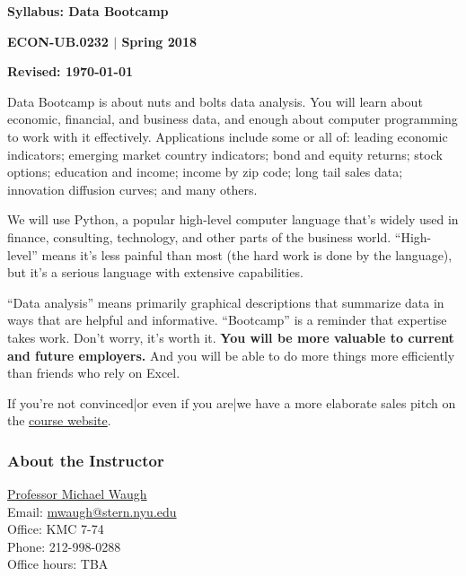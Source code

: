 



\pagestyle{headandfoot}
\runningheadrule
\firstpageheadrule
{}
\runningfooter{}{}{}


\centerline{\Large\bf Syllabus:  Data Bootcamp}
\vspace{3mm}
\centerline{\large\bf ECON-UB.0232 $|$ Spring 2018}
\vspace{3mm}
\centerline{\bf Revised:  \today}

\bigskip

Data Bootcamp is about nuts and bolts data analysis. You will learn about economic, financial, and business
data, and enough about computer programming to work with it effectively. Applications include some or all of: leading economic indicators; emerging market country indicators; bond and equity returns; stock options; education and income; income by zip code; long tail sales data; innovation diffusion curves; and many others.

We will use Python, a popular high-level computer language that's widely used in finance, consulting,
technology, and other parts of the business world. ``High-level'' means it's less painful than most (the hard work is done by the language), but it's a serious language with extensive capabilities.

``Data analysis'' means primarily graphical descriptions that summarize data
in ways that are helpful and informative. ``Bootcamp'' is a reminder that expertise takes work. Don't worry, it's worth it. {\bf You will be more valuable to current and future employers.\/} And you will be able to do more things more efficiently than friends who rely on Excel.

If you're not convinced|or even if you are|we have a more elaborate sales pitch on the
\href{https://nyu.data-bootcamp.com/}{course website}.

\subsubsection*{About the Instructor}
\href{http://www.waugheconomics.com}{Professor Michael Waugh} \\
Email: \href{mailto:mailto:mwaugh@stern.nyu.edu}{mwaugh@stern.nyu.edu}\\
Office: KMC 7-74\\
Phone: 212-998-0288\\
Office hours: TBA

